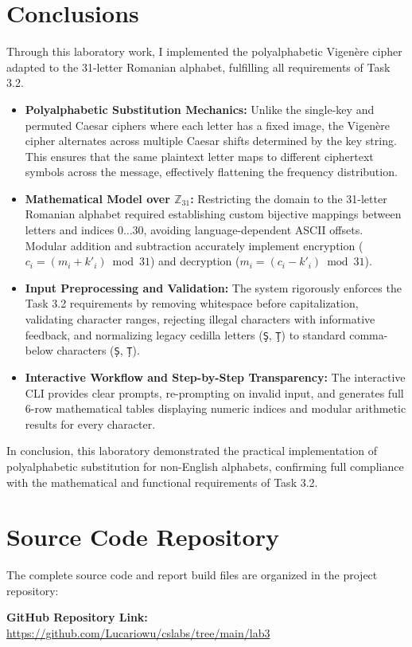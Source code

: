 \documentclass{labreport}
\begin{document}
\section{Conclusions}

Through this laboratory work, I implemented the polyalphabetic Vigenère cipher adapted to the 31-letter Romanian alphabet, fulfilling all requirements of Task 3.2.

\begin{itemize}[leftmargin=*]
    \item \textbf{Polyalphabetic Substitution Mechanics:} Unlike the single-key and permuted Caesar ciphers where each letter has a fixed image, the Vigenère cipher alternates across multiple Caesar shifts determined by the key string. This ensures that the same plaintext letter maps to different ciphertext symbols across the message, effectively flattening the frequency distribution.
    \item \textbf{Mathematical Model over $\mathbb{Z}_{31}$:} Restricting the domain to the 31-letter Romanian alphabet required establishing custom bijective mappings between letters and indices $0 \dots 30$, avoiding language-dependent ASCII offsets. Modular addition and subtraction accurately implement encryption ($c_i = (m_i + k'_i) \bmod 31$) and decryption ($m_i = (c_i - k'_i) \bmod 31$).
    \item \textbf{Input Preprocessing and Validation:} The system rigorously enforces the Task 3.2 requirements by removing whitespace before capitalization, validating character ranges, rejecting illegal characters with informative feedback, and normalizing legacy cedilla letters (\texttt{Ş}, \texttt{Ţ}) to standard comma-below characters (\texttt{Ș}, \texttt{Ț}).
    \item \textbf{Interactive Workflow and Step-by-Step Transparency:} The interactive CLI provides clear prompts, re-prompting on invalid input, and generates full 6-row mathematical tables displaying numeric indices and modular arithmetic results for every character.
\end{itemize}

In conclusion, this laboratory demonstrated the practical implementation of polyalphabetic substitution for non-English alphabets, confirming full compliance with the mathematical and functional requirements of Task 3.2.

\section{Source Code Repository}

The complete source code and report build files are organized in the project repository:

\begin{center}
    \textbf{GitHub Repository Link:}\\
    \url{https://github.com/Lucariowu/cslabs/tree/main/lab3}
\end{center}
\end{document}
